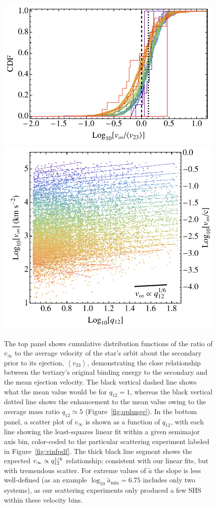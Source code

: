 \documentclass[a4paper,twocolumn]{emulateapj}
\begin{document}
{\begin{figure}
\centering\includegraphics[width=0.9\linewidth,clip=true]{vratio}
\centering\includegraphics[width=0.9\linewidth,clip=true]{vinfq}
\caption{The top panel shows cumulative distribution functions of the ratio of $v_{\infty}$ to the average velocity of the star's orbit about the secondary prior to its ejection, $\left<v_{23}\right>$, demonstrating the close relationship between the tertiary's original binding energy to the secondary and the mean ejection velocity. The black vertical dashed line shows what the mean value would be for $q_{12} = 1$, whereas the black vertical dotted line shows the enhancement to the mean value owing to the average mass ratio $q_{12} \simeq 5$ (Figure~\ref{fig:qplunge}). In the bottom panel, a scatter plot of $v_{\infty}$ is shown as a function of $q_{12}$, with each line showing the least-squares linear fit within a given semimajor axis bin, color-coded to the particular scattering experiment labeled in Figure~\ref{fig:vinfpdf}. The thick black line segment shows the expected $v_{\infty} \propto q_{12}^{\smash{1/6}}$ relationship; consistent with our linear fits, but with tremendous scatter. For extreme values of $\tilde{a}$ the slope is less well-defined (as an example $\log_{10} \tilde{a}_{\min} = 6.75$ includes only two systems), as our scattering experiments only produced a few SHS within these velocity bins.}
\label{fig:vratio}
\end{figure}

}
\end{document}
